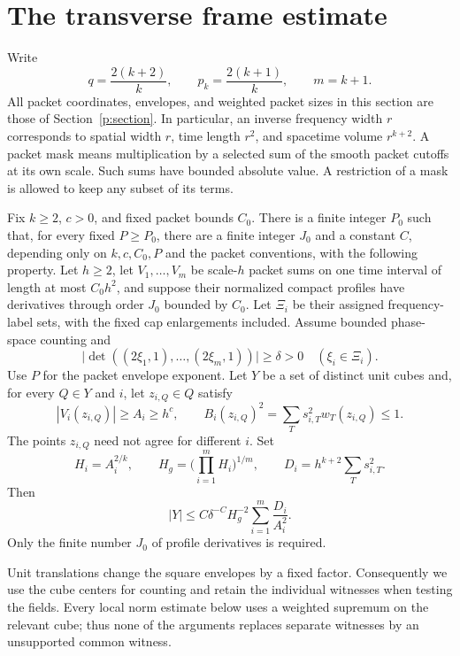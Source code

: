 \section{The transverse frame estimate}\label{f:section}

Write
\[
 q=\frac{2(k+2)}k,\qquad p_k=\frac{2(k+1)}k,\qquad m=k+1.
\]
All packet coordinates, envelopes, and weighted packet sizes in this
section are those of Section~\ref{p:section}. In particular, an inverse
frequency width $r$ corresponds to spatial width $r$, time length $r^2$,
and spacetime volume $r^{k+2}$. A packet mask means multiplication by a
selected sum of the smooth packet cutoffs at its own scale. Such sums
have bounded absolute value. A restriction of a mask is allowed to keep
any subset of its terms.

\begin{theorem}\label{f:frame}
Fix $k\ge2$, $c>0$, and fixed packet bounds $C_0$. There is a finite
integer $P_0$ such that, for every fixed $P\ge P_0$, there are a finite
integer $J_0$ and a constant $C$, depending only on $k,c,C_0,P$ and the
packet conventions, with the following property. Let $h\ge2$, let
$V_1,\ldots,V_m$ be scale-$h$
packet sums on one time interval of length at most $C_0h^2$, and suppose
their normalized compact profiles have derivatives through order $J_0$
bounded by $C_0$. Let $\Xi_i$ be their assigned frequency-label sets,
with the fixed cap enlargements included. Assume bounded phase-space
counting and
\[
 \big|\det((2\xi_1,1),\ldots,(2\xi_m,1))\big|\ge\delta>0
 \quad(\xi_i\in\Xi_i).
\]
Use $P$ for the packet envelope exponent. Let $Y$ be a set of
distinct unit cubes and, for every $Q\in Y$ and $i$, let $z_{i,Q}\in Q$
satisfy
\[
 |V_i(z_{i,Q})|\ge A_i\ge h^c,
 \qquad B_i(z_{i,Q})^2=\sum_Ts_{i,T}^2w_T(z_{i,Q})\le1.
\]
The points $z_{i,Q}$ need not agree for different $i$. Set
\[
 H_i=A_i^{2/k},\qquad H_g=\Big(\prod_{i=1}^mH_i\Big)^{1/m},
 \qquad D_i=h^{k+2}\sum_Ts_{i,T}^2.
\]
Then
\begin{equation}\label{f:mainbound}
 |Y|\le C\delta^{-C}H_g^{-2}\sum_{i=1}^m\frac{D_i}{A_i^2}.
\end{equation}
Only the finite number $J_0$ of profile derivatives is required.
\end{theorem}

Unit translations change the square envelopes by a fixed factor.
Consequently we use the cube centers for counting and retain the
individual witnesses when testing the fields. Every local norm estimate
below uses a weighted supremum on the relevant cube; thus none of the
arguments replaces separate witnesses by an unsupported common
witness.

